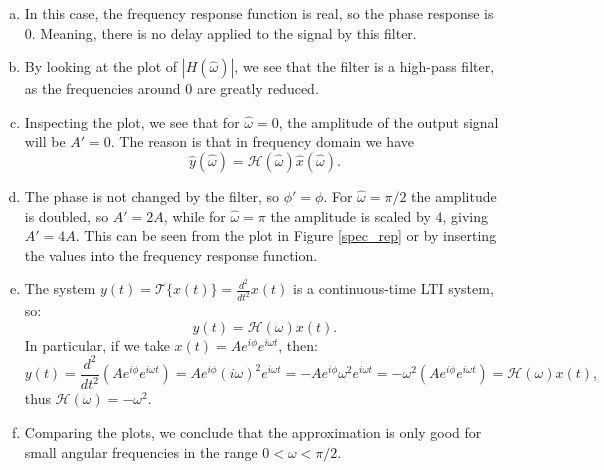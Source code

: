 \begin{enumerate}
\begin{enumerate}[a)]
\item In this case, the frequency response function is real, so the phase response is $0$. Meaning, there is no delay applied to the signal by this filter.

\item By looking at the plot of $|H(\hat{\omega})|$, we see that the filter is a high-pass filter, as the frequencies around $0$ are greatly reduced. 

\item Inspecting the plot, we see that for $\hat{\omega}=0$, the amplitude of the output signal will be $A'=0$. The reason is that in frequency domain we have
$$\hat{y}(\hat{\omega})=\mathcal{H}(\hat{\omega})\hat{x}(\hat{\omega}).$$

\item The phase is not changed by the filter, so $\phi'=\phi$. For $\hat{\omega}=\pi/2$ the amplitude is doubled, so $A'=2A$, while for $\hat{\omega}=\pi$ the amplitude is scaled by $4$, giving $A'=4A$. 
This can be seen from the plot in Figure \ref{spec_rep} or by inserting the values into the frequency response function. 

\item The system $y(t)=\mathcal{T}\{x(t)\}=\frac{d^{2}}{dt^{2}}x(t)$ is a continuous-time LTI system, so:
$$y(t)=\mathcal{H}(\omega)x(t).$$
In particular, if we take $x(t)=Ae^{i\phi}e^{i\omega t}$, then:
$$y(t)=\frac{d^{2}}{dt^{2}}(Ae^{i\phi}e^{i\omega t})=Ae^{i\phi}(i\omega)^{2}e^{i\omega t}=-Ae^{i\phi}\omega^{2}e^{i\omega t}=-\omega^{2}(Ae^{i\phi}e^{i\omega t})=\mathcal{H}(\omega)x(t),$$
thus $\mathcal{H}(\omega)=-\omega^{2}$. 

\item Comparing the plots, we conclude that the approximation is only good for small angular frequencies in the range $0<\omega<\pi/2$. 
\end{enumerate}

\end{enumerate}


